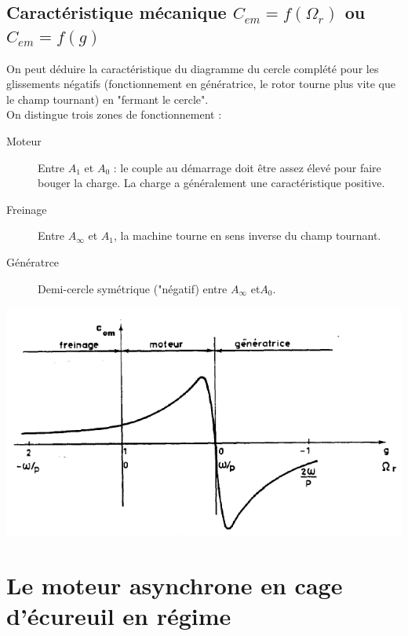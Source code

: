 		
		
	\subsection{Caractéristique mécanique $C_{em} = f(\Omega_r)$ ou $C_{em} = f(g)$}
	On peut déduire la caractéristique du diagramme du cercle complété pour les glissements 
	négatifs (fonctionnement en génératrice, le rotor tourne plus vite que le champ tournant) en 
	"fermant le cercle".\\
	On distingue trois zones de fonctionnement :
	\begin{description}
	\item[Moteur] Entre $A_1$ et $A_0$ : le couple au démarrage doit être assez élevé pour faire 
	bouger la charge. La charge a généralement une caractéristique positive.
	\item[Freinage] Entre $A_\infty$ et $A_1$, la machine tourne en sens inverse du champ tournant.
	\item[Génératrce] Demi-cercle symétrique ("négatif) entre $A_\infty$ et$ A_0$.
	\end{description}
			\begin{center}
		\includegraphics[scale=0.4]{ch5/image31.png}
		\end{center}



\section{Le moteur asynchrone en cage d’écureuil en régime}














	
	
	
	
	
	
	
	
	
	
	